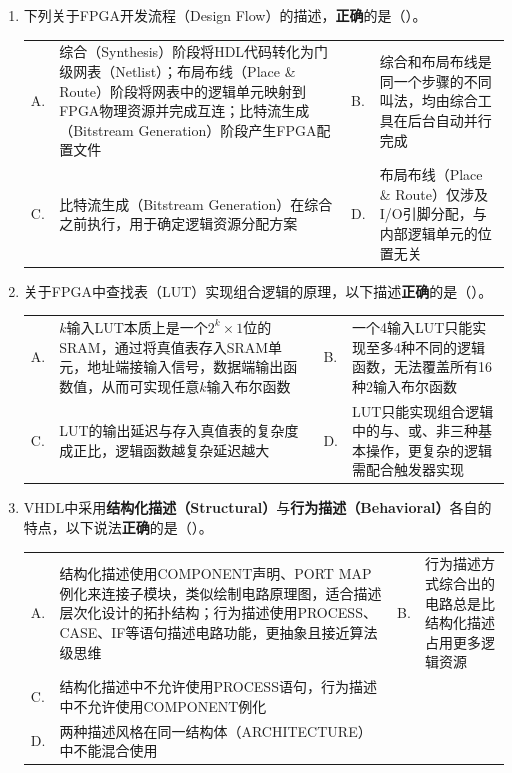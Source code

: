 \begin{enumerate}[label=\arabic*.]

\item 下列关于FPGA开发流程（Design Flow）的描述，\textbf{正确}的是（\quad）。

\vspace{0.3cm}

\begin{tabular}{@{}lp{}@{\qquad}lp{}@{}}
A. & 综合（Synthesis）阶段将HDL代码转化为门级网表（Netlist）；布局布线（Place \& Route）阶段将网表中的逻辑单元映射到FPGA物理资源并完成互连；比特流生成（Bitstream Generation）阶段产生FPGA配置文件 &
B. & 综合和布局布线是同一个步骤的不同叫法，均由综合工具在后台自动并行完成 \\
C. & 比特流生成（Bitstream Generation）在综合之前执行，用于确定逻辑资源分配方案 &
D. & 布局布线（Place \& Route）仅涉及I/O引脚分配，与内部逻辑单元的位置无关 \\
\end{tabular}

\vspace{0.8cm}

\item 关于FPGA中查找表（LUT）实现组合逻辑的原理，以下描述\textbf{正确}的是（\quad）。

\vspace{0.3cm}

\begin{tabular}{@{}lp{}@{\qquad}lp{}@{}}
A. & $k$输入LUT本质上是一个$2^k\times1$位的SRAM，通过将真值表存入SRAM单元，地址端接输入信号，数据端输出函数值，从而可实现任意$k$输入布尔函数 &
B. & 一个4输入LUT只能实现至多4种不同的逻辑函数，无法覆盖所有16种2输入布尔函数 \\
C. & LUT的输出延迟与存入真值表的复杂度成正比，逻辑函数越复杂延迟越大 &
D. & LUT只能实现组合逻辑中的与、或、非三种基本操作，更复杂的逻辑需配合触发器实现 \\
\end{tabular}

\vspace{0.8cm}

\item VHDL中采用\textbf{结构化描述（Structural）}与\textbf{行为描述（Behavioral）}各自的特点，以下说法\textbf{正确}的是（\quad）。

\vspace{0.3cm}

\begin{tabular}{@{}lp{}@{\qquad}lp{}@{}}
A. & 结构化描述使用COMPONENT声明、PORT MAP例化来连接子模块，类似绘制电路原理图，适合描述层次化设计的拓扑结构；行为描述使用PROCESS、CASE、IF等语句描述电路功能，更抽象且接近算法级思维 &
B. & 行为描述方式综合出的电路总是比结构化描述占用更多逻辑资源 \\
C. & 结构化描述中不允许使用PROCESS语句，行为描述中不允许使用COMPONENT例化 \\
D. & 两种描述风格在同一结构体（ARCHITECTURE）中不能混合使用 \\
\end{tabular}


\end{enumerate}
